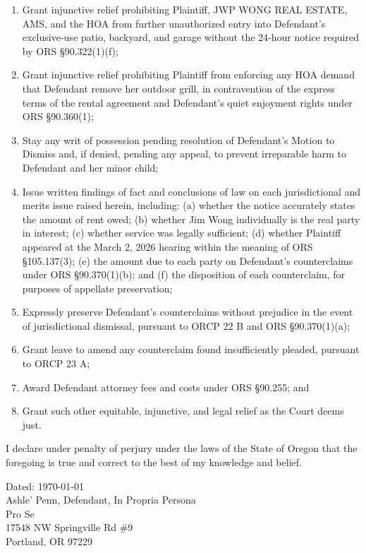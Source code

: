 \documentclass[12pt,letterpaper]{article}
\newcommand{\signatureblock}[1]{%
	\vspace{0.5in}
	\noindent Dated: \today \\
	\vspace{1in}
	#1 \\
	Pro Se \\
	17548 NW Springville Rd \#9 \\
	Portland, OR 97229 \\
}
\begin{document}
\begin{enumerate}
		\item Grant injunctive relief prohibiting Plaintiff, JWP WONG REAL ESTATE, AMS, and the HOA from further unauthorized entry into Defendant's exclusive-use patio, backyard, and garage without the 24-hour notice required by ORS \S90.322(1)(f);
		
		\item Grant injunctive relief prohibiting Plaintiff from enforcing any HOA demand that Defendant remove her outdoor grill, in contravention of the express terms of the rental agreement and Defendant's quiet enjoyment rights under ORS \S90.360(1);
		
		\item Stay any writ of possession pending resolution of Defendant's Motion to Dismiss and, if denied, pending any appeal, to prevent irreparable harm to Defendant and her minor child;
		
		\item Issue written findings of fact and conclusions of law on each jurisdictional and merits issue raised herein, including: (a) whether the notice accurately states the amount of rent owed; (b) whether Jim Wong individually is the real party in interest; (c) whether service was legally sufficient; (d) whether Plaintiff appeared at the March 2, 2026 hearing within the meaning of ORS \S105.137(3); (e) the amount due to each party on Defendant's counterclaims under ORS \S90.370(1)(b); and (f) the disposition of each counterclaim, for purposes of appellate preservation;
		
		\item Expressly preserve Defendant's counterclaims without prejudice in the event of jurisdictional dismissal, pursuant to ORCP 22 B and ORS \S90.370(1)(a);
		
		\item Grant leave to amend any counterclaim found insufficiently pleaded, pursuant to ORCP 23 A;
		
		\item Award Defendant attorney fees and costs under ORS \S90.255; and
		
		\item Grant such other equitable, injunctive, and legal relief as the Court deems just.
	\end{enumerate}
	
	I declare under penalty of perjury under the laws of the State of Oregon that the foregoing is true and correct to the best of my knowledge and belief.
	
	\signatureblock{Ashle' Penn, Defendant, In Propria Persona}
	
\end{document}

